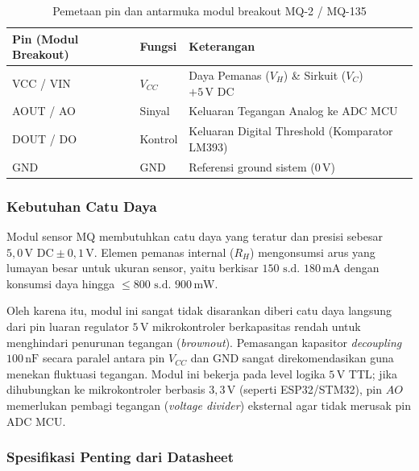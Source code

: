 \begin{table}[H]
	\centering
	\caption{Pemetaan pin dan antarmuka modul breakout MQ-2 / MQ-135}
	\label{tab:mq_pin}
	\small
	\begin{tabularx}{\textwidth}{@{}llX@{}}
		\toprule
		Pin (Modul Breakout) & Fungsi   & Keterangan                                                \\
		\midrule
		VCC / VIN            & $V_{CC}$ & Daya Pemanas ($V_H$) \& Sirkuit ($V_C$) $+5\,\text{V DC}$ \\
		AOUT / AO            & Sinyal   & Keluaran Tegangan Analog ke ADC MCU                       \\
		DOUT / DO            & Kontrol  & Keluaran Digital Threshold (Komparator LM393)             \\
		GND                  & GND      & Referensi ground sistem ($0\,\text{V}$)                   \\
		\bottomrule
	\end{tabularx}
\end{table}

\subsubsection{Kebutuhan Catu Daya}
Modul sensor MQ membutuhkan catu daya yang teratur dan presisi sebesar $5{,}0\,\text{V DC} \pm 0{,}1\,\text{V}$. Elemen pemanas internal ($R_H$) mengonsumsi arus yang lumayan besar untuk ukuran sensor, yaitu berkisar $150\text{ s.d. }180\,\text{mA}$ dengan konsumsi daya hingga $\le 800\text{ s.d. }900\,\text{mW}$.

Oleh karena itu, modul ini sangat tidak disarankan diberi catu daya langsung dari pin luaran regulator $5\,\text{V}$ mikrokontroler berkapasitas rendah untuk menghindari penurunan tegangan (\textit{brownout}). Pemasangan kapasitor \textit{decoupling} $100\,\text{nF}$ secara paralel antara pin $V_{CC}$ dan GND sangat direkomendasikan guna menekan fluktuasi tegangan. Modul ini bekerja pada level logika $5\,\text{V}$ TTL; jika dihubungkan ke mikrokontroler berbasis $3{,}3\,\text{V}$ (seperti ESP32/STM32), pin $AO$ memerlukan pembagi tegangan (\textit{voltage divider}) eksternal agar tidak merusak pin ADC MCU.

\subsubsection{Spesifikasi Penting dari Datasheet}

